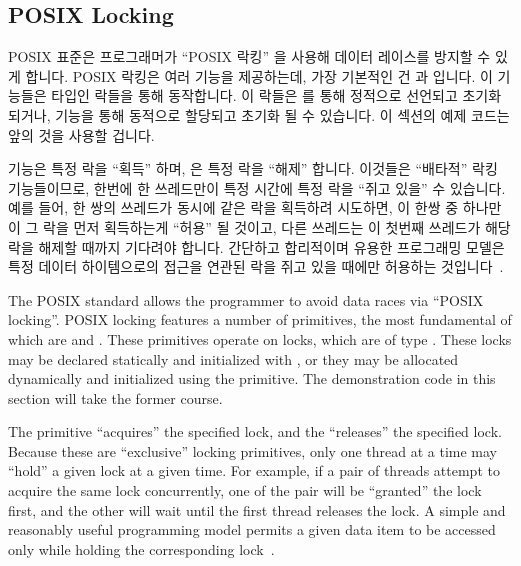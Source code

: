 \subsection{POSIX Locking}
\label{sec:toolsoftrade:POSIX Locking}

POSIX 표준은 프로그래머가 ``POSIX 락킹'' 을 사용해 데이터 레이스를 방지할 수
있게 합니다.
POSIX 락킹은 여러 기능을 제공하는데, 가장 기본적인 건
 과  입니다.
이 기능들은  타입인 락들을 통해 동작합니다.
이 락들은  를 통해 정적으로 선언되고 초기화
되거나,  기능을 통해 동적으로 할당되고 초기화 될 수
있습니다.
이 섹션의 예제 코드는 앞의 것을 사용할 겁니다.

 기능은 특정 락을 ``획득'' 하며,
 은 특정 락을 ``해제'' 합니다.
이것들은 ``배타적'' 락킹 기능들이므로, 한번에 한 쓰레드만이 특정 시간에 특정
락을 ``쥐고 있을'' 수 있습니다.
예를 들어, 한 쌍의 쓰레드가 동시에 같은 락을 획득하려 시도하면, 이 한쌍 중
하나만이 그 락을 먼저 획득하는게 ``허용'' 될 것이고, 다른 쓰레드는 이 첫번째
쓰레드가 해당 락을 해제할 때까지 기다려야 합니다.
간단하고 합리적이며 유용한 프로그래밍 모델은 특정 데이터 하이템으로의 접근을
연관된 락을 쥐고 있을 때에만 허용하는 것입니다~\cite{Hoare74}.

\iffalse

The POSIX standard allows the programmer to avoid data races via
``POSIX locking''.
POSIX locking features a number of primitives, the most fundamental
of which are  and .
These primitives operate on locks, which are of type .
These locks may be declared statically and initialized with
, or they may be allocated dynamically
and initialized using the  primitive.
The demonstration code in this section will take the former course.

The  primitive ``acquires'' the specified lock,
and the  ``releases'' the specified lock.
Because these are ``exclusive'' locking primitives,
only one thread at a time may ``hold'' a given lock at a given time.
For example, if a pair of threads attempt to acquire the same lock
concurrently, one of the pair will be ``granted'' the lock first, and
the other will wait until the first thread releases the lock.
A simple and reasonably useful programming model permits a given data item
to be accessed only while holding the corresponding
lock~\cite{Hoare74}.

